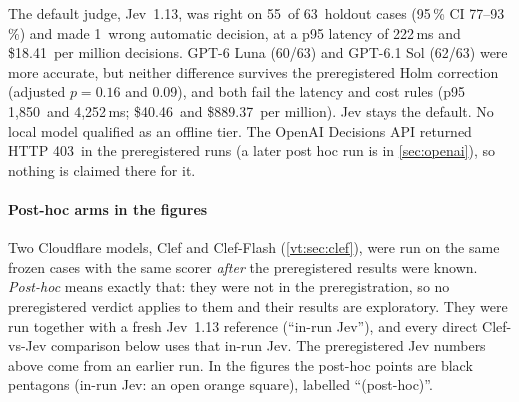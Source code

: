 \documentclass[11pt,letterpaper]{article}
\newcommand{\term}[1]{\emph{#1}}
\newcommand{\HoldN}{63}
\newcommand{\HoldProbeStatus}{403}
\newcommand{\JevHoldAccCI}{77--93\,\%}
\newcommand{\JevHoldAccK}{55}
\newcommand{\JevHoldCost}{18.41}
\newcommand{\JevHoldPninetyfive}{222}
\newcommand{\JevHoldWaK}{1}
\newcommand{\LunaHoldAccK}{60}
\newcommand{\LunaHoldCost}{40.46}
\newcommand{\LunaHoldPninetyfive}{1{,}850}
\newcommand{\LunaHoldRAccPHolm}{0.16}
\newcommand{\SolHoldAccK}{62}
\newcommand{\SolHoldCost}{889.37}
\newcommand{\SolHoldPninetyfive}{4{,}252}
\newcommand{\SolHoldRAccPHolm}{0.09}
\begin{document}
The default judge, Jev~1.13, was right on \JevHoldAccK\ of \HoldN\ holdout cases (95\,\% CI \JevHoldAccCI) and
made \JevHoldWaK\ wrong automatic decision, at a p95 latency of \JevHoldPninetyfive\,ms and \$\JevHoldCost\ per
million decisions. GPT-6 Luna (\LunaHoldAccK/\HoldN) and GPT-6.1 Sol (\SolHoldAccK/\HoldN) were more accurate,
but neither difference survives the preregistered Holm correction (adjusted $p = \LunaHoldRAccPHolm$ and
\SolHoldRAccPHolm), and both fail the latency and cost rules (p95 \LunaHoldPninetyfive\ and
\SolHoldPninetyfive\,ms; \$\LunaHoldCost\ and \$\SolHoldCost\ per million). Jev stays the default. No local model
qualified as an offline tier. The OpenAI Decisions API returned HTTP \HoldProbeStatus\ in the preregistered runs (a later post hoc run is in \cref{sec:openai}), so nothing is claimed there
for it.

\paragraph{Post-hoc arms in the figures} Two Cloudflare models, Clef and Clef-Flash (\cref{vt:sec:clef}), were run on
the same frozen cases with the same scorer \emph{after} the preregistered results were known. \term{Post-hoc} means
exactly that: they were not in the preregistration, so no preregistered verdict applies to them and their results
are exploratory. They were run together with a fresh Jev~1.13 reference (``in-run Jev''), and every direct Clef-vs-Jev
comparison below uses that in-run Jev. The preregistered Jev numbers above come from an earlier run. In the figures
the post-hoc points are black pentagons (in-run Jev: an open orange square), labelled ``(post-hoc)''.
\end{document}

